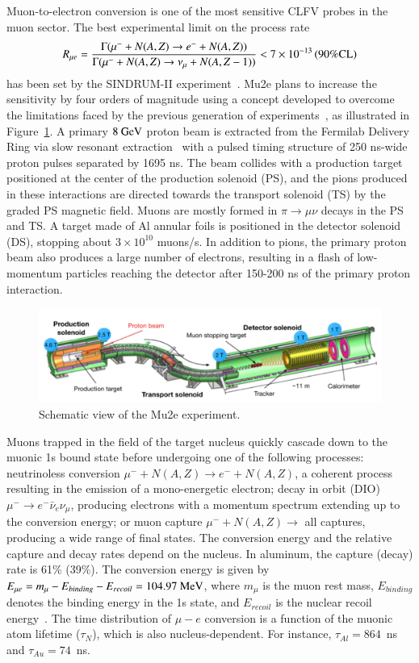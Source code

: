 Muon-to-electron conversion is one of the most sensitive CLFV probes in the muon sector. The best experimental limit on the process rate 
$$R_{\mu e} = \frac{\Gamma(\mu^- +N(A,Z) \rightarrow  e^- + N(A,Z))}{\Gamma(\mu^- +N(A,Z) \rightarrow \nu_\mu + N(A,Z-1))}  < 7 \times 10^{-13} \rm \, (90\% CL)$$
has been set by the SINDRUM-II experiment~\cite{SINDRUMII:2006dvw}. Mu2e plans to increase the sensitivity by four orders of magnitude using a concept developed to overcome the limitations faced by the previous generation of experiments~\cite{Dzhilkibaev:1989zb}, as illustrated in Figure~\ref{fig:Mu2eExp}. A primary $8 ~\mbox{GeV}$ proton beam is extracted from the Fermilab Delivery Ring via slow resonant extraction~\cite{PhysRevAccelBeams.22.043501} with a pulsed timing structure of 250 ns-wide proton pulses separated by 1695 ns. The beam collides with a production target positioned at the center of the production solenoid (PS), and the pions produced in these interactions are directed towards the transport solenoid (TS) by the graded PS magnetic field. Muons are mostly formed in $\pi \rightarrow \mu \nu$ decays in the PS and TS. A target made of Al annular foils is positioned in the detector solenoid (DS), stopping about $3\times 10^{10}$ muons/s.  
In addition to pions, the primary proton beam also produces a large number of electrons, resulting in a flash of low-momentum particles reaching the detector after 150-200 ns of the primary proton interaction.
%
\begin{figure}[ht!]
\begin{center}
\includegraphics[width=0.9\linewidth]{figures/Mu2eExp.png}
\caption{Schematic view of the Mu2e experiment.}
\label{fig:Mu2eExp}
\end{center}
\end{figure}
%
Muons trapped in the field of the target nucleus quickly cascade down to the muonic 1s bound state before undergoing one of the following processes: neutrinoless conversion $\mu^- +N(A,Z) \rightarrow  e^- + N(A,Z)$, a coherent process resulting in the emission of a mono-energetic electron; decay in orbit (DIO) $\mu^- \rightarrow e^- \bar\nu_e \nu_\mu$, producing electrons with a momentum spectrum extending up to the conversion energy; or muon capture $\mu^- +N(A,Z) \rightarrow $ all captures, producing a wide range of final states. The conversion energy and the relative capture and decay rates depend on the nucleus. In aluminum, the capture (decay) rate is 61\% (39\%). The conversion energy is given by $E_{\mu e} = m_\mu - E_{binding} - E_{recoil} = 104.97 ~\mbox{MeV}$, where $m_\mu$ is the muon rest mass, $E_{binding}$ denotes the binding energy in the 1s state, and $E_{recoil}$ is the nuclear recoil energy~\cite{Czarnecki:2011mx,Szafron:2017guu}. The time distribution of $\mu-e$ conversion is a function of the muonic atom lifetime ($\tau_N$), which is also nucleus-dependent. For instance, $\tau_{Al}=864$~ns and $\tau_{Au} = 74$~ns. 

